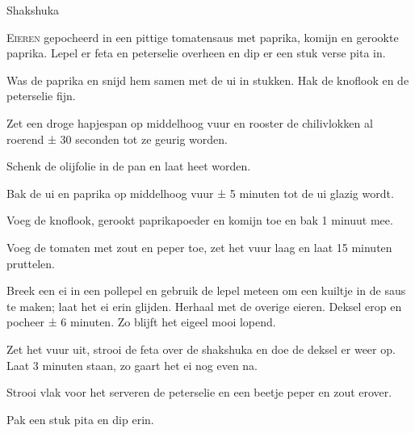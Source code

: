 \begin{recipe}{Shakshuka}


\lettrine{E}{ieren} gepocheerd in een pittige tomatensaus met paprika, komijn en
gerookte paprika. Lepel er feta en peterselie overheen en dip er een stuk verse
pita in.

\begin{ingredients}
\end{ingredients}

\begin{steps}
  \item Was de paprika en snijd hem samen met de ui in stukken. Hak de
        knoflook en de peterselie fijn.
  \item Zet een droge hapjespan op middelhoog vuur en rooster de chilivlokken
        al roerend ± 30 seconden tot ze geurig worden.
  \item Schenk de olijfolie in de pan en laat heet worden.
  \item Bak de ui en paprika op middelhoog vuur ± 5 minuten tot de ui glazig
        wordt.
  \item Voeg de knoflook, gerookt paprikapoeder en komijn toe en bak 1 minuut mee.
  \item Voeg de tomaten met zout en peper toe, zet het vuur laag en laat 15
        minuten pruttelen.
  \item Breek een ei in een pollepel en gebruik de lepel meteen om een kuiltje in
        de saus te maken; laat het ei erin glijden. Herhaal met de overige
        eieren. Deksel erop en pocheer ± 6 minuten. Zo blijft het eigeel mooi
        lopend.
  \item Zet het vuur uit, strooi de feta over de shakshuka en doe de deksel er
        weer op. Laat 3 minuten staan, zo gaart het ei nog even na.
  \item Strooi vlak voor het serveren de peterselie en een beetje peper en zout
        erover.
  \item Pak een stuk pita en dip erin.
\end{steps}

\end{recipe}
